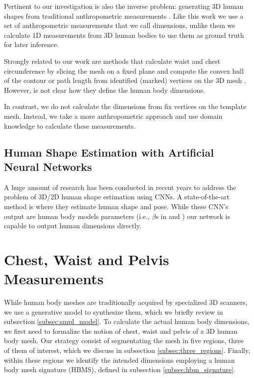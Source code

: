 \documentclass[runningheads, orivec]{llncs}
\begin{document}
Pertinent to our investigation is also the inverse problem: generating 3D human 
shapes from traditional anthropometric measurements \cite{Wuhrer.2013}. Like this work we use a set of 
anthropometric measurements that we call dimensions, unlike them we calculate 
1D measurements from 3D human bodies to use them as ground truth for later 
inference.

Strongly related to our work are methods that calculate waist and 
chest circumference by slicing the mesh on a fixed plane and compute the convex hull of the contour \cite{Guan.2013} or path length from identified (marked) 
vertices on the 3D mesh \cite{Boisvert.2013,Dibra.2016a,Dibra.2016b}. However, is not clear how they define the human body dimensions.

In contrast, we do not 
calculate the dimensions from fix vertices on the template 
mesh. Instead, we 
take a more anthropometric approach and use domain knowledge to calculate these 
measurements.

\subsection{Human Shape Estimation with Artificial Neural Networks}
A huge amount of research has been conducted in recent years to address the 
problem of 3D/2D human shape estimation using CNNs. A state-of-the-art method 
is \cite{kanazawaHMR18} where they estimate human 
shape and pose. While these CNN's output are human body models parameters 
(i.e., $\beta$s in \cite{Dibra.2016a} and \cite{varol18_bodynet}) our network 
is 
capable to output human dimensions directly.

\section{Chest, Waist and Pelvis Measurements}\label{sec:approach}
While human body 
meshes are traditionally acquired by specialized 3D scanners, we use a 
generative model to synthesize them, which we briefly review in 
subsection \ref{subsec:smpl_model}. To calculate the actual human body 
dimensions, we first need to formalize the 
notion of chest, waist and pelvis of a 3D human body mesh. Our strategy consist 
of segmentating the mesh in five regions, 
three of them of interest, which we 
discuss in subsection \ref{subsec:three_regions}. Finally, within these regions 
we identify the intended dimensions employing a human body mesh signature 
(HBMS), 
defined in subsection \ref{subsec:hbm_signature}.
\end{document}
